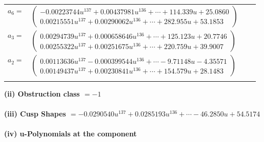 \documentclass[1p]{elsarticle_modified}
\theoremstyle{definition}
\begin{document}
\begin{tabular}{m{7pt} m{180pt} m{7pt} m{180pt} }
\flushright $a_{6}=$&$\begin{pmatrix}-0.00223744 u^{137}+0.00437981 u^{136}+\cdots+114.339 u+25.0860\\0.00215551 u^{137}+0.00290062 u^{136}+\cdots+282.955 u+53.1853\end{pmatrix}$ \\
\flushright $a_{3}=$&$\begin{pmatrix}0.00294739 u^{137}+0.000658646 u^{136}+\cdots+125.123 u+20.7746\\0.00255322 u^{137}+0.00251675 u^{136}+\cdots+220.759 u+39.9007\end{pmatrix}$ \\
\flushright $a_{2}=$&$\begin{pmatrix}0.00113636 u^{137}-0.000399544 u^{136}+\cdots-9.71148 u-4.35571\\0.00149437 u^{137}+0.00230841 u^{136}+\cdots+154.579 u+28.1483\end{pmatrix}$\\&\end{tabular}
\flushleft \textbf{(ii) Obstruction class $= -1$}\\~\\
\flushleft \textbf{(iii) Cusp Shapes $= -0.0290540 u^{137}+0.0285193 u^{136}+\cdots-46.2850 u+54.5174$}\\~\\
\newpage\renewcommand{\arraystretch}{1}
\flushleft \textbf{(iv) u-Polynomials at the component}\newline \\
\end{document}
